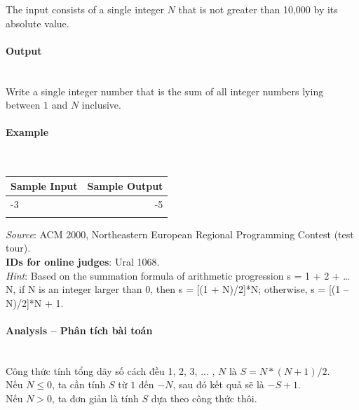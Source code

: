 \documentclass{article}
\begin{document}
The input consists of a single integer $N$ that is not greater than 10,000 by its absolute value.

\paragraph{Output}\mbox{} \\

Write a single integer number that is the sum of all integer numbers lying between $1$ and $N$ inclusive.

\paragraph{Example}\mbox{} \\

\begin{table}[h]
    \centering
    \begin{tabular}{|l|r|}
        \hline
        \textbf{Sample Input} & \textbf{Sample Output} \\
        \hline
        -3 & -5  \\ 
            &  \\ \hline
    \end{tabular}
\end{table}

\textit{Source}: ACM 2000, Northeastern European Regional Programming Contest (test tour). \\

\textbf{IDs for online judges}: Ural 1068. \\

\textit{Hint}: Based on the summation formula of arithmetic progression s = 1 + 2 + … N, if N is an integer larger than 0, then s = [(1 + N)/2]*N; otherwise, s = [(1 – N)/2]*N + 1.


\paragraph{Analysis -- Phân tích bài toán} \mbox{} \\

Công thức tính tổng dãy số cách đều {1, 2, 3, ... , $N$} là $S = N * ( N + 1) / 2$.\\

Nếu $N \leq 0$, ta cần tính $S$ từ $1$ đến $-N$, sau đó kết quả sẽ là $-S+1$. \\

Nếu $N > 0$, ta đơn giản là tính $S$ dựa theo công thức thôi. \\
\end{document}
